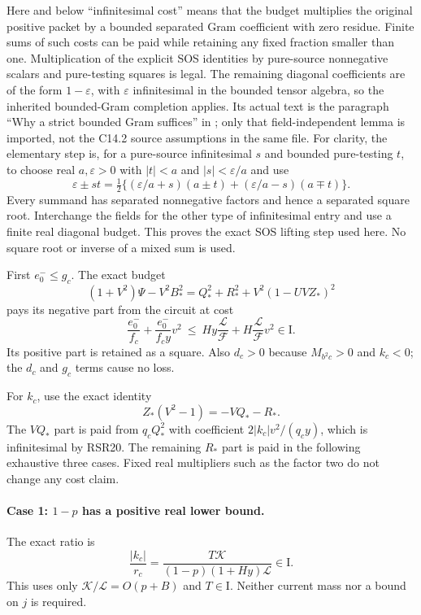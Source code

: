Here and below ``infinitesimal cost'' means that the budget multiplies
the original positive packet by a bounded separated Gram coefficient
with zero residue. Finite sums of such costs can be paid while retaining
any fixed fraction smaller than one. Multiplication of the explicit
SOS identities by pure-source nonnegative scalars and pure-testing
squares is legal. The remaining diagonal coefficients are of the form
$1-\varepsilon$, with $\varepsilon$ infinitesimal in the bounded tensor
algebra, so the inherited bounded-Gram completion applies. Its actual
text is the paragraph ``Why a strict bounded Gram suffices'' in
; only that field-independent
lemma is imported, not the C14.2 source assumptions in the same file.
For clarity, the elementary step is, for a pure-source infinitesimal
$s$ and bounded pure-testing $t$, to choose real $a,\varepsilon>0$
with $|t|<a$ and $|s|<\varepsilon/a$ and use
\[
 \varepsilon\pm st=\tfrac12\{(\varepsilon/a+s)(a\pm t)
                         +(\varepsilon/a-s)(a\mp t)\}.
\]
Every summand has separated nonnegative factors and hence a separated
square root. Interchange the fields for the other type of infinitesimal
entry and use a finite real diagonal budget. This proves the exact
SOS lifting step used here. No square root or inverse of a mixed sum
is used.

First $e_0^-\leq g_c$. The exact budget
\[
 (1+V^2)\Psi-V^2B_*^2
 =Q_*^2+R_*^2+V^2(1-UVZ_*)^2
 \tag{RSR23}
\]
pays its negative part from the circuit at cost
\[
 \frac{e_0^-}{f_c}+\frac{e_0^-}{f_cy}v^2
 \ \leq\ Hy\frac{\mathcal L}{\mathcal F}
       +H\frac{\mathcal L}{\mathcal F}v^2\in\mathrm I.
\]
Its positive part is retained as a square. Also $d_c>0$ because
$M_{b^2c}>0$ and $k_c<0$; the $d_c$ and $g_c$ terms cause no loss.

For $k_c$, use the exact identity
\[
 Z_*(V^2-1)=-VQ_*-R_*.
 \tag{RSR24}
\]
The $VQ_*$ part is paid from $q_cQ_*^2$ with coefficient
$2|k_c|v^2/(q_cy)$, which is infinitesimal by RSR20. The remaining
$R_*$ part is paid in the following exhaustive three cases. Fixed
real multipliers such as the factor two do not change any cost claim.

\paragraph{Case 1: $1-p$ has a positive real lower bound.}
The exact ratio is
\[
 \frac{|k_c|}{r_c}
 =\frac{T\mathcal K}{(1-p)(1+Hy)\mathcal L}\in\mathrm I.
 \tag{RSR25}
\]
This uses only $\mathcal K/\mathcal L=O(p+B)$ and $T\in\mathrm I$.
Neither current mass nor a bound on $j$ is required.

